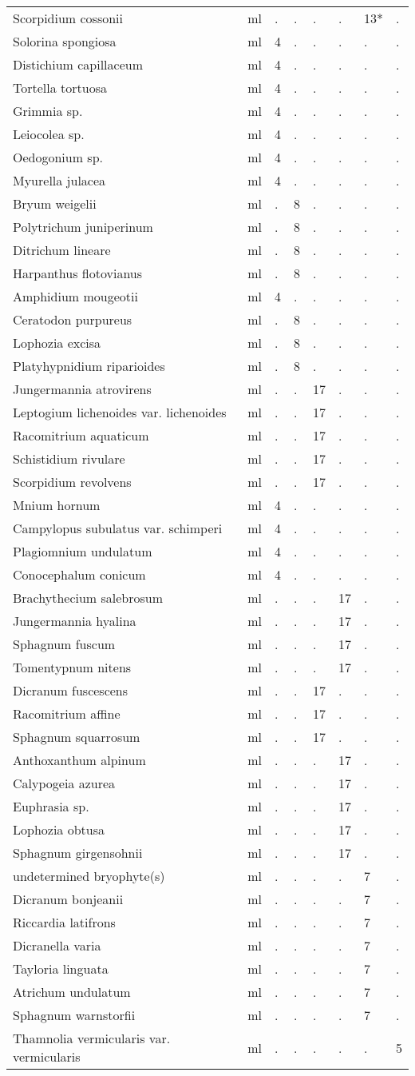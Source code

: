 \begin{longtable}{p{60mm}p{10mm}p{5mm}p{5mm}p{5mm}p{5mm}p{5mm}p{5mm}}
Scorpidium cossonii&ml&.&.&.&.&13*&.\tabularnewline
Solorina spongiosa&ml&4&.&.&.&.&.\tabularnewline
Distichium capillaceum&ml&4&.&.&.&.&.\tabularnewline
Tortella tortuosa&ml&4&.&.&.&.&.\tabularnewline
Grimmia sp.&ml&4&.&.&.&.&.\tabularnewline
Leiocolea sp.&ml&4&.&.&.&.&.\tabularnewline
Oedogonium sp.&ml&4&.&.&.&.&.\tabularnewline
Myurella julacea&ml&4&.&.&.&.&.\tabularnewline
Bryum weigelii&ml&.&8&.&.&.&.\tabularnewline
Polytrichum juniperinum&ml&.&8&.&.&.&.\tabularnewline
Ditrichum lineare&ml&.&8&.&.&.&.\tabularnewline
Harpanthus flotovianus&ml&.&8&.&.&.&.\tabularnewline
Amphidium mougeotii&ml&4&.&.&.&.&.\tabularnewline
Ceratodon purpureus&ml&.&8&.&.&.&.\tabularnewline
Lophozia excisa&ml&.&8&.&.&.&.\tabularnewline
Platyhypnidium riparioides&ml&.&8&.&.&.&.\tabularnewline
Jungermannia atrovirens&ml&.&.&17&.&.&.\tabularnewline
Leptogium lichenoides var. lichenoides&ml&.&.&17&.&.&.\tabularnewline
Racomitrium aquaticum&ml&.&.&17&.&.&.\tabularnewline
Schistidium rivulare&ml&.&.&17&.&.&.\tabularnewline
Scorpidium revolvens&ml&.&.&17&.&.&.\tabularnewline
Mnium hornum&ml&4&.&.&.&.&.\tabularnewline
Campylopus subulatus var. schimperi&ml&4&.&.&.&.&.\tabularnewline
Plagiomnium undulatum&ml&4&.&.&.&.&.\tabularnewline
Conocephalum conicum&ml&4&.&.&.&.&.\tabularnewline
Brachythecium salebrosum&ml&.&.&.&17&.&.\tabularnewline
Jungermannia hyalina&ml&.&.&.&17&.&.\tabularnewline
Sphagnum fuscum&ml&.&.&.&17&.&.\tabularnewline
Tomentypnum nitens&ml&.&.&.&17&.&.\tabularnewline
Dicranum fuscescens&ml&.&.&17&.&.&.\tabularnewline
Racomitrium affine&ml&.&.&17&.&.&.\tabularnewline
Sphagnum squarrosum&ml&.&.&17&.&.&.\tabularnewline
Anthoxanthum alpinum&ml&.&.&.&17&.&.\tabularnewline
Calypogeia azurea&ml&.&.&.&17&.&.\tabularnewline
Euphrasia sp.&ml&.&.&.&17&.&.\tabularnewline
Lophozia obtusa&ml&.&.&.&17&.&.\tabularnewline
Sphagnum girgensohnii&ml&.&.&.&17&.&.\tabularnewline
undetermined bryophyte(s)&ml&.&.&.&.&7&.\tabularnewline
Dicranum bonjeanii&ml&.&.&.&.&7&.\tabularnewline
Riccardia latifrons&ml&.&.&.&.&7&.\tabularnewline
Dicranella varia&ml&.&.&.&.&7&.\tabularnewline
Tayloria linguata&ml&.&.&.&.&7&.\tabularnewline
Atrichum undulatum&ml&.&.&.&.&7&.\tabularnewline
Sphagnum warnstorfii&ml&.&.&.&.&7&.\tabularnewline
Thamnolia vermicularis var. vermicularis&ml&.&.&.&.&.&5\tabularnewline
\bottomrule
\end{longtable}

